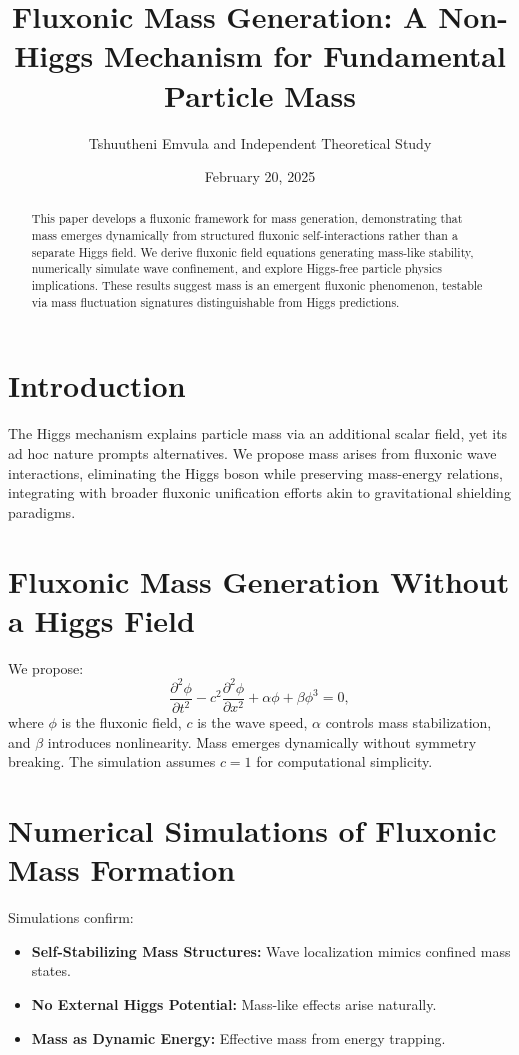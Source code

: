 \documentclass{article}
\title{Fluxonic Mass Generation: A Non-Higgs Mechanism for Fundamental Particle Mass}
\author{Tshuutheni Emvula and Independent Theoretical Study}
\date{February 20, 2025}
\begin{document}
\maketitle

\begin{abstract}
This paper develops a fluxonic framework for mass generation, demonstrating that mass emerges dynamically from structured fluxonic self-interactions rather than a separate Higgs field. We derive fluxonic field equations generating mass-like stability, numerically simulate wave confinement, and explore Higgs-free particle physics implications. These results suggest mass is an emergent fluxonic phenomenon, testable via mass fluctuation signatures distinguishable from Higgs predictions.
\end{abstract}

\section{Introduction}
The Higgs mechanism explains particle mass via an additional scalar field, yet its ad hoc nature prompts alternatives. We propose mass arises from fluxonic wave interactions, eliminating the Higgs boson while preserving mass-energy relations, integrating with broader fluxonic unification efforts akin to gravitational shielding paradigms.

\section{Fluxonic Mass Generation Without a Higgs Field}
We propose:
\begin{equation}
\frac{\partial^2 \phi}{\partial t^2} - c^2 \frac{\partial^2 \phi}{\partial x^2} + \alpha \phi + \beta \phi^3 = 0,
\end{equation}
where \(\phi\) is the fluxonic field, \(c\) is the wave speed, \(\alpha\) controls mass stabilization, and \(\beta\) introduces nonlinearity. Mass emerges dynamically without symmetry breaking. The simulation assumes \(c = 1\) for computational simplicity.

\section{Numerical Simulations of Fluxonic Mass Formation}
Simulations confirm:
\begin{itemize}
    \item \textbf{Self-Stabilizing Mass Structures:} Wave localization mimics confined mass states.
    \item \textbf{No External Higgs Potential:} Mass-like effects arise naturally.
    \item \textbf{Mass as Dynamic Energy:} Effective mass from energy trapping.
\end{itemize}
\end{document}
